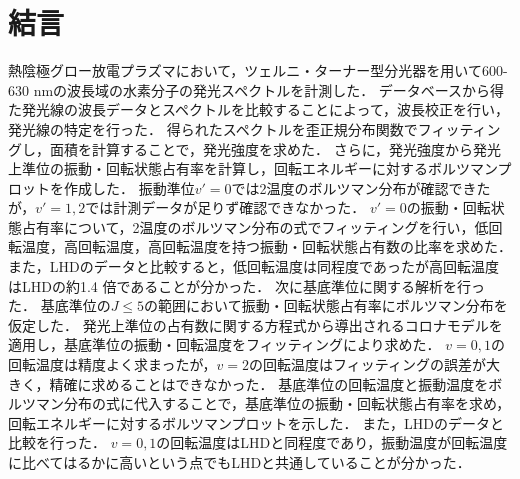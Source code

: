 \chapter{結言}

熱陰極グロー放電プラズマにおいて，ツェルニ・ターナー型分光器を用いて600-630 nmの波長域の水素分子の発光スペクトルを計測した．
データベースから得た発光線の波長データとスペクトルを比較することによって，波長校正を行い，発光線の特定を行った．
得られたスペクトルを歪正規分布関数でフィッティングし，面積を計算することで，発光強度を求めた．
さらに，発光強度から発光上準位の振動・回転状態占有率を計算し，回転エネルギーに対するボルツマンプロットを作成した．
振動準位$v'=0$では2温度のボルツマン分布が確認できたが，$v'=1,2$では計測データが足りず確認できなかった．
$v'=0$の振動・回転状態占有率について，2温度のボルツマン分布の式でフィッティングを行い，低回転温度，高回転温度，高回転温度を持つ振動・回転状態占有数の比率を求めた．
また，LHDのデータと比較すると，低回転温度は同程度であったが高回転温度はLHDの約1.4 倍であることが分かった．
次に基底準位に関する解析を行った．
基底準位の$J \leq 5$の範囲において振動・回転状態占有率にボルツマン分布を仮定した．
発光上準位の占有数に関する方程式から導出されるコロナモデルを適用し，基底準位の振動・回転温度をフィッティングにより求めた．
$v=0,1$の回転温度は精度よく求まったが，$v=2$の回転温度はフィッティングの誤差が大きく，精確に求めることはできなかった．
基底準位の回転温度と振動温度をボルツマン分布の式に代入することで，基底準位の振動・回転状態占有率を求め，回転エネルギーに対するボルツマンプロットを示した．
また，LHDのデータと比較を行った．
$v=0,1$の回転温度はLHDと同程度であり，振動温度が回転温度に比べてはるかに高いという点でもLHDと共通していることが分かった．
